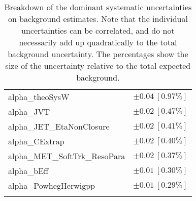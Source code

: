 \begin{table}
\begin{center}
\begin{tabular*}{\textwidth}{@{\extracolsep{\fill}}lc}
alpha\_theoSysW         & $\pm 0.04\ [0.97\%] $       \\
alpha\_JVT         & $\pm 0.02\ [0.47\%] $       \\
alpha\_JET\_EtaNonClosure         & $\pm 0.02\ [0.41\%] $       \\
alpha\_CExtrap         & $\pm 0.02\ [0.40\%] $       \\
alpha\_MET\_SoftTrk\_ResoPara         & $\pm 0.02\ [0.37\%] $       \\
alpha\_bEff         & $\pm 0.01\ [0.30\%] $       \\
alpha\_PowhegHerwigpp         & $\pm 0.01\ [0.29\%] $       \\
\noalign{\smallskip}\hline\noalign{\smallskip}
\end{tabular*}
\end{center}
\caption[Breakdown of uncertainty on background estimates]{
Breakdown of the dominant systematic uncertainties on background estimates.
Note that the individual uncertainties can be correlated, and do not necessarily add up quadratically to 
the total background uncertainty. The percentages show the size of the uncertainty relative to the total expected background.
\label{table.results.bkgestimate.uncertainties.SRE}}
\end{table}
%